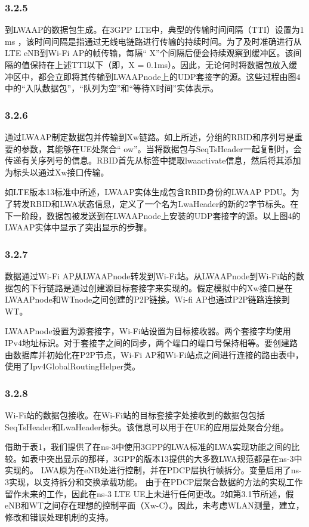 \subsubsection*{3.2.5}
到LWAAP的数据包生成。在3GPP LTE中，典型的传输时间间隔（TTI）设置为1 ms \cite{LTE}，该时间间隔是指通过无线电链路进行传输的持续时间。为了及时准确进行从LTE eNB到Wi-Fi AP的帧传输，每隔“ X”个间隔后便会持续观察到缓冲区。该间隔的值保持在上述TTI以下（即，X = 0.1ms）。因此，无论何时将数据包放入缓冲区中，都会立即将其传输到LWAAPnode上的UDP套接字的源。这些过程由图4中的“入队数据包”，“队列为空”和“等待X时间”实体表示。

\subsubsection*{3.2.6}
通过LWAAP制定数据包并传输到Xw链路。如上所述，分组的RBID和序列号是重要的参数，其能够在UE处聚合“ ow”。当将数据包与SeqTsHeader一起复制时，会传递有关序列号的信息。RBID首先从标签中提取lwaactivate信息，然后将其添加为标头以通过Xw接口传输。

如LTE版本13标准中所述，LWAAP实体生成包含RBID身份的LWAAP PDU。为了转发RBID和LWA状态信息，定义了一个名为LwaHeader的新的2字节标头。在下一阶段，数据包被发送到在LWAAPnode上安装的UDP套接字的源。以上图4的LWAAP实体中显示了突出显示的步骤。

\subsubsection*{3.2.7}
数据通过Wi-Fi AP从LWAAPnode转发到Wi-Fi站。从LWAAPnode到Wi-Fi站的数据包的下行链路是通过创建源目标套接字来实现的。假定模拟中的Xw接口是在LWAAPnode和WTnode之间创建的P2P链接。Wi-fi AP也通过P2P链路连接到WT。

LWAAPnode设置为源套接字，Wi-Fi站设置为目标接收器。两个套接字均使用IPv4地址标识。对于套接字之间的同步，两个端口的端口号保持相等。要创建路由数据库并初始化在P2P节点，Wi-Fi AP和Wi-Fi站点之间进行连接的路由表中，使用了Ipv4GlobalRoutingHelper类。

\subsubsection*{3.2.8}
Wi-Fi站的数据包接收。在Wi-Fi站的目标套接字处接收到的数据包包括SeqTsHeader和LwaHeader标头。该信息可以用于在UE的应用层处聚合分组。

借助于表1，我们提供了在ns-3中使用3GPP的LWA标准的LWA实现功能之间的比较。如表中突出显示的那样，3GPP的版本13提供的大多数LWA规范都是在ns-3中实现的。
LWA原为在eNB处进行控制，并在PDCP层执行帧拆分。变量启用了ns-3实现，以支持拆分和交换承载功能。
由于在PDCP层聚合数据的方法的实现工作留作未来的工作，因此在ns-3 LTE UE上未进行任何更改。2如第3.1节所述，假eNB和WT之间存在理想的控制平面（Xw-C）。因此，未考虑WLAN测量，建立，修改和错误处理机制的支持。

